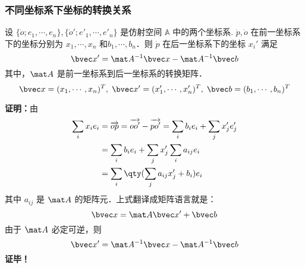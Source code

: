 \subsubsection{不同坐标系下坐标的转换关系}
\begin{theorem}{}
设 $\{\dot o;e_1,\cdots,e_n\},\{\dot o';e'_1,\cdots,e'_n\}$ 是仿射空间 $\mathbb A$ 中的两个坐标系. $\dot p,\dot o$ 在前一坐标系下的坐标分别为 $x_1,\cdots,x_n$ 和$b_1,\cdots,b_n$．则 $\dot p$ 在后一坐标系下的坐标 $x_i'$ 满足
\begin{equation}
\bvec x'=\mat A^{-1}\bvec x-\mat A^{-1}\bvec b
\end{equation}
 其中，$\mat A$ 是前一坐标系到后一坐标系的转换矩阵．
 \begin{equation}
 \bvec x=(x_1,\cdots,x_n)^T,\;\bvec x'=(x_1',\cdots,x_n')^T,\;\bvec b=(b_1,\cdots,b_n)^T
 \end{equation}
 
\end{theorem}
\textbf{证明：}由
\begin{equation}
\begin{aligned}
\sum_{i}x_ie_i&=\overrightarrow{op}=\overrightarrow{oo'}-\overrightarrow{po'}=\sum_{i}b_ie_i+\sum_{j}x'_je'_j\\
&=\sum_i b_ie_i+\sum_{j}x'_j\sum_{i}a_{ij}e_i\\
&=\sum_{i}\qty(\sum_{j}a_{ij}x_j'+b_i)e_i
\end{aligned}
\end{equation}
其中 $a_{ij}$ 是 $\mat A$ 的矩阵元．上式翻译成矩阵语言就是：
\begin{equation}
\bvec x=\mat A\bvec x'+\bvec b
\end{equation}
由于 $\mat A$ 必定可逆，则
\begin{equation}
\bvec x'=\mat A^{-1}\bvec x-\mat A^{-1}\bvec b
\end{equation}
\textbf{证毕！}

